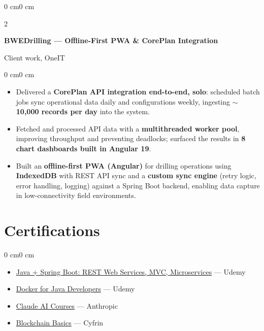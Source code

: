 \documentclass[10pt, letterpaper]{article}
\newenvironment{highlights}{
    \begin{itemize}[
        topsep=0.08 cm,
        parsep=0.08 cm,
        partopsep=0pt,
        itemsep=0pt,
        leftmargin=0.4 cm
    ]
}{
    \end{itemize}
}
\newenvironment{onecolentry}{
    \begin{adjustwidth}{0 cm}{0 cm}
}{
    \end{adjustwidth}
}
\newenvironment{twocolentry}[2][]{
    \onecolentry
    \def\secondColumn{#2}
    \setcolumnwidth{\fill, 4.5 cm}
    \begin{paracol}{2}
}{
    \switchcolumn \raggedleft \secondColumn
    \end{paracol}
    \endonecolentry
}
\begin{document}
    \vspace{0.2 cm}

    \begin{twocolentry}{Client work, OneIT}
        \textbf{BWEDrilling --- Offline-First PWA \& CorePlan Integration}
    \end{twocolentry}

    \vspace{0.05 cm}
    \begin{onecolentry}
        \begin{highlights}
            \item Delivered a \textbf{CorePlan API integration end-to-end, solo}: scheduled batch jobs sync operational data daily and configurations weekly, ingesting \textbf{$\sim$10,000 records per day} into the system.
            \item Fetched and processed API data with a \textbf{multithreaded worker pool}, improving throughput and preventing deadlocks; surfaced the results in \textbf{8 chart dashboards built in Angular 19}.
            \item Built an \textbf{offline-first PWA (Angular)} for drilling operations using \textbf{IndexedDB} with REST API sync and a \textbf{custom sync engine} (retry logic, error handling, logging) against a Spring Boot backend, enabling data capture in low-connectivity field environments.
        \end{highlights}
    \end{onecolentry}

    \section{Certifications}

    \begin{onecolentry}
        \begin{highlights}
            \item \href{https://www.udemy.com/certificate/UC-cb01df41-429b-4c2e-b1fc-60c96fb85ced/}{Java + Spring Boot: REST Web Services, MVC, Microservices} --- Udemy
            \item \href{https://www.udemy.com/certificate/UC-18968747-942e-411c-abe9-f31e5f148ef5/}{Docker for Java Developers} --- Udemy
            \item \href{https://drive.google.com/drive/folders/11kdCro2_PWed0t7jxECr94ADKgRjZk3c?usp=sharing}{Claude AI Courses} --- Anthropic
            \item \href{https://profiles.cyfrin.io/u/vandans08/achievements/blockchain-basics}{Blockchain Basics} --- Cyfrin
        \end{highlights}
    \end{onecolentry}
\end{document}
